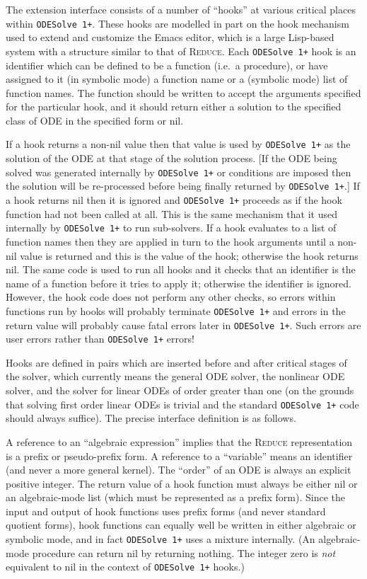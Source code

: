 \documentclass[a4paper]{article} %
\newcommand{\ODESolve}[1]{\texttt{ODESolve\,#1}}
\newcommand{\REDUCE}{\textsc{Reduce}}
\begin{document}
The extension interface consists of a number of ``hooks'' at various
critical places within \ODESolve{1+}.  These hooks are modelled in
part on the hook mechanism used to extend and customize the Emacs
editor, which is a large Lisp-based system with a structure similar to
that of \REDUCE\@.  Each \ODESolve{1+} hook is an identifier which can
be defined to be a function (i.e.\ a procedure), or have assigned to
it (in symbolic mode) a function name or a (symbolic mode) list of
function names.  The function should be written to accept the
arguments specified for the particular hook, and it should return
either a solution to the specified class of ODE in the specified form
or nil.

If a hook returns a non-nil value then that value is used by
\ODESolve{1+} as the solution of the ODE at that stage of the solution
process.  [If the ODE being solved was generated internally by
\ODESolve{1+} or conditions are imposed then the solution will be
re-processed before being finally returned by \ODESolve{1+}.]  If a
hook returns nil then it is ignored and \ODESolve{1+} proceeds as if
the hook function had not been called at all.  This is the same
mechanism that it used internally by \ODESolve{1+} to run sub-solvers.
If a hook evaluates to a list of function names then they are applied
in turn to the hook arguments until a non-nil value is returned and
this is the value of the hook; otherwise the hook returns nil.  The
same code is used to run all hooks and it checks that an identifier is
the name of a function before it tries to apply it; otherwise the
identifier is ignored.  However, the hook code does not perform any
other checks, so errors within functions run by hooks will probably
terminate \ODESolve{1+} and errors in the return value will probably
cause fatal errors later in \ODESolve{1+}.  Such errors are user
errors rather than \ODESolve{1+} errors!

Hooks are defined in pairs which are inserted before and after
critical stages of the solver, which currently means the general ODE
solver, the nonlinear ODE solver, and the solver for linear ODEs of
order greater than one (on the grounds that solving first order linear
ODEs is trivial and the standard \ODESolve{1+} code should always
suffice).  The precise interface definition is as follows.

A reference to an ``algebraic expression'' implies that the \REDUCE{}
representation is a prefix or pseudo-prefix form.  A reference to a
``variable'' means an identifier (and never a more general kernel).
The ``order'' of an ODE is always an explicit positive integer.  The
return value of a hook function must always be either nil or an
algebraic-mode list (which must be represented as a prefix form).
Since the input and output of hook functions uses prefix forms (and
never standard quotient forms), hook functions can equally well be
written in either algebraic or symbolic mode, and in fact \ODESolve{1+}
uses a mixture internally.  (An algebraic-mode procedure can return
nil by returning nothing.  The integer zero is \emph{not} equivalent
to nil in the context of \ODESolve{1+} hooks.)
\end{document}

